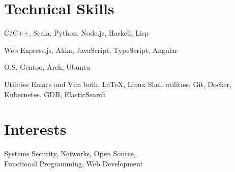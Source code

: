 \documentclass{tccv}
\begin{document}
\vspace{-0.4cm}
\section{Technical Skills}

C/C++, Scala, Python, Node.js, Haskell, Lisp

\vspace{0.3cm}
\begin{factlist}

\item{\small{Web}}
  {Express.js, Akka, JavaScript, TypeScript, Angular}

\item{\small{O.S.}}
  {Gentoo, Arch, Ubuntu}

\item {\small{Utilities}}
  {Emacs and Vim both, \LaTeX, Linux Shell utilities, Git, Docker,
    Kubernetes, GDB, ElasticSearch}

\end{factlist}

\vspace{-0.3cm}
\section{Interests}
Systems Security, Networks, Open Source,\\Functional
Programming, Web Development
\end{document}
